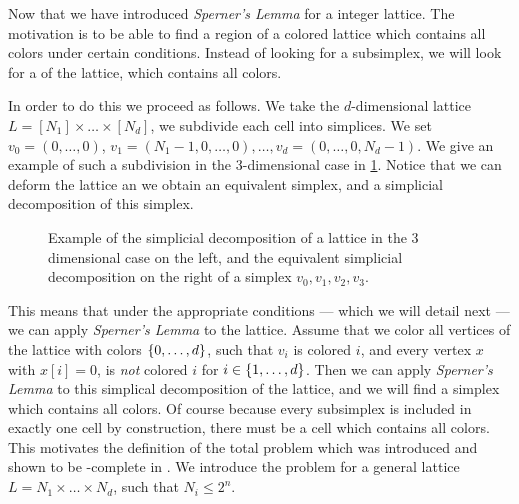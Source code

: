 Now that we have introduced \textit{Sperner's Lemma} for a integer lattice. The motivation is to be able to find a region of a colored lattice which contains all colors under certain conditions. Instead of looking for a subsimplex, we will look for a  of the lattice, which contains all colors.

In order to do this we proceed as follows. We take the $d$-dimensional lattice $L = [N_1] \times \dots \times [N_d]$, we subdivide each cell into simplices. We set $v_0 = (0, \dots, 0)$, $v_1 = (N_1 - 1, 0, \dots, 0), \dots, v_d = (0, \dots, 0, N_d - 1)$. We give an example of such a subdivision in the 3-dimensional case in \cref{fig:sperner_lattice_example}. Notice that we can deform the lattice an we obtain an equivalent simplex, and a simplicial decomposition of this simplex.

\begin{figure}
    \centering
    \caption[Example of a simplicial decomposition of a lattice]{Example of the simplicial decomposition of a lattice in the 3 dimensional case on the left, and the equivalent simplicial decomposition on the right of a simplex $v_0, v_1, v_2, v_3$.}
    \label{fig:sperner_lattice_example}
\end{figure}

This means that under the appropriate conditions --- which we will detail next --- we can apply \textit{Sperner's Lemma} to the lattice. Assume that we color all vertices of the lattice with colors $\left\{0, \dots, d\right\}$, such that $v_i$ is colored $i$, and every vertex $x$ with $x[i] = 0$, is \textit{not} colored $i$ for $i \in \left\{1, \dots, d\right\}$. Then we can apply \textit{Sperner's Lemma} to this simplical decomposition of the lattice, and we will find a simplex which contains all colors. Of course because every subsimplex is included in exactly one cell by construction, there must be a cell which contains all colors. This motivates the definition of the total problem \Sperner which was introduced and shown to be \PPAD-complete in . We introduce the problem for a general lattice $L = N_1 \times \dots \times N_d$, such that $N_i \leq 2^n$.


